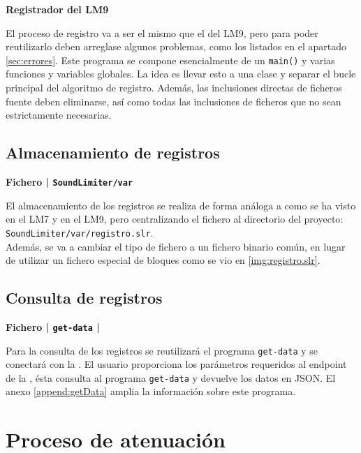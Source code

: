 \begin{flushright}
\textbf{Registrador del \acrshort{LM9}}
\end{flushright}

El proceso de registro va a ser el mismo que el del \acrshort{LM9}, pero para poder reutilizarlo deben arreglase algunos problemas, como los listados en el apartado \ref{sec:errores}. Este programa se compone esencialmente de un \texttt{main()} y varias funciones y variables globales. La idea es llevar esto a una clase y separar el bucle principal del algoritmo de registro. Además, las inclusiones directas de ficheros fuente deben eliminarse, así como todas las inclusiones de ficheros que no sean estrictamente necesarias.

\subsection{Almacenamiento de registros}

\begin{flushright}
\textbf{Fichero | \texttt{SoundLimiter/var}}
\end{flushright}

El almacenamiento de los registros se realiza de forma análoga a como se ha visto en el \acrshort{LM7} y en el \acrshort{LM9}, pero centralizando el fichero al directorio del proyecto: \texttt{SoundLimiter/var/registro.slr}.\\
Además, se va a cambiar el tipo de fichero a un fichero binario común, en lugar de utilizar un fichero especial de bloques como se vio en \ref{img:registro.slr}.

\subsection{Consulta de registros}

\begin{flushright}
\textbf{Fichero | \texttt{get-data} | }
\end{flushright}

Para la consulta de los registros se reutilizará el programa \texttt{get-data} y se conectará con la . El usuario proporciona los parámetros requeridos al endpoint de la , ésta consulta al programa \texttt{get-data} y devuelve los datos en \acrshort{JSON}. El anexo \ref{append:getData} amplia la información sobre este programa.

\section{Proceso de atenuación}

